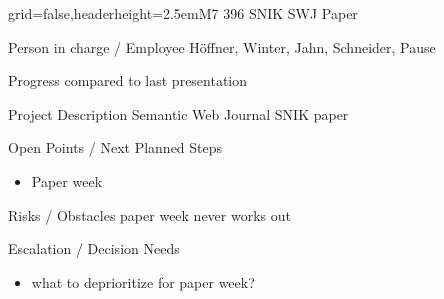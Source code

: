 \documentclass[english]{kiesgrube}
\begin{document}
\begin{poster}{grid=false,headerheight=2.5em}{}{M7 396 SNIK SWJ Paper}{}{}
\begin{posterbox}[name=person,column=0,row=0]{Person in charge / Employee}
Höffner, Winter, Jahn, Schneider, Pause
\end{posterbox}
\begin{posterbox}[name=progress,below=person]{Progress compared to last presentation}
\end{posterbox}
\begin{posterbox}[name=description,column=1,row=0]{Project Description}
Semantic Web Journal SNIK paper
\end{posterbox}
\begin{posterbox}[name=open,column=1,below=description]{Open Points / Next Planned Steps}
\begin{itemize}
\item Paper week
\end{itemize}
\end{posterbox}
\begin{posterbox}[name=risks,column=1,below=open]{Risks / Obstacles}
paper week never works out
\end{posterbox}
\begin{posterbox}[name=escalation,column=1,below=risks]{Escalation / Decision Needs}
\begin{itemize}
\item what to deprioritize for paper week?
\end{itemize}
\end{posterbox}
\footer
\end{poster}
\end{document}
